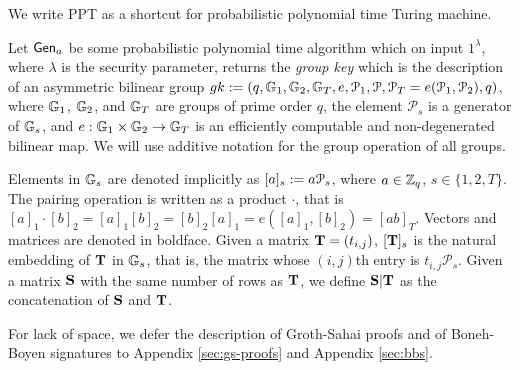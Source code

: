 
We write PPT as a shortcut for probabilistic polynomial time Turing machine.

Let $\mathsf{Gen}_a$ be some probabilistic polynomial time algorithm which on input $1^{\lambda}$, where $\lambda$ is the security parameter, returns the \emph{group key} which is the description of an asymmetric bilinear group $gk:=(q,\mathbb{G}_1,\mathbb{G}_2,\mathbb{G}_T,e,\mathcal{P}_1,\mathcal{P},\mathcal{P}_T=e(\mathcal{P}_1,\mathcal{P}_2),q)$, where $\mathbb{G}_1$, $\mathbb{G}_2$,
and $\mathbb{G}_T$ are groups of prime order $q$, the element $\mathcal{P}_s$ is a generator of 
$\mathbb{G}_s$, and $e:\mathbb{G}_1\times\mathbb{G}_2\to\mathbb{G}_T$ is an efficiently computable and non-degenerated bilinear map. We will use additive notation for the group operation of all groups.

Elements in $\mathbb{G}_s$ are denoted implicitly as $[a]_s:=a \mathcal{P}_s$, where $a\in\mathbb{Z}_q$, $s\in\{1,2,T\}$. 
The pairing operation is written as a product $\cdot$, that is $[a]_1 \cdot [b]_2 = [a]_1 [b]_2= [b]_2[a]_1=e([a]_1,[b]_2)=[ab]_T$. Vectors and matrices are denoted in boldface. Given a matrix $\mathbf{{T}}=(t_{i,j})$, $[\mathbf{{T}}]_s$ is
the natural embedding of $\mathbf{{T}}$ in $\mathbb{G}_s$, that is, the matrix whose $(i,j)$th entry is $t_{i,j}\mathcal{P}_s$. Given a matrix $\mathbf{{S}}$ with the same number of rows as $\mathbf{{T}}$, we define $\mathbf{{S}}|\mathbf{{T}}$ as the concatenation of $\mathbf{{S}}$ and $\mathbf{{T}}$.

For lack of space, we defer the description of Groth-Sahai proofs and of Boneh-Boyen signatures to Appendix \ref{sec:gs-proofs} and Appendix \ref{sec:bbs}.